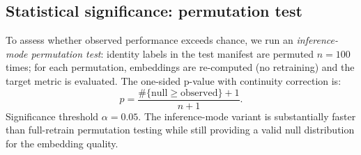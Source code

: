 \subsection{Statistical significance: permutation test}

To assess whether observed performance exceeds chance, we run an \emph{inference-mode
permutation test}: identity labels in the test manifest are permuted $n = 100$ times; for
each permutation, embeddings are re-computed (no retraining) and the target metric is
evaluated.  The one-sided p-value with continuity correction is:
\begin{equation}
  p = \frac{\#\{\mathrm{null} \ge \mathrm{observed}\} + 1}{n + 1}.
  \label{eq:pvalue}
\end{equation}
Significance threshold $\alpha = 0.05$.  The inference-mode variant is substantially faster
than full-retrain permutation testing while still providing a valid null distribution for
the embedding quality.
